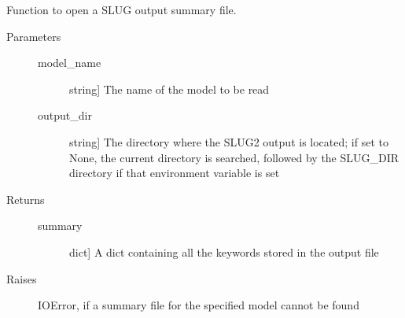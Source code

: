 \documentclass[letterpaper,10pt,english]{sphinxmanual}
\begin{document}
\begin{fulllineitems}
\label{slugpy:slugpy.read_summary}
Function to open a SLUG output summary file.
\begin{description}
\item[{Parameters}] \leavevmode\begin{description}
\item[{model\_name}] \leavevmode{[}string{]}
The name of the model to be read

\item[{output\_dir}] \leavevmode{[}string{]}
The directory where the SLUG2 output is located; if set to None,
the current directory is searched, followed by the SLUG\_DIR
directory if that environment variable is set

\end{description}

\item[{Returns}] \leavevmode\begin{description}
\item[{summary}] \leavevmode{[}dict{]}
A dict containing all the keywords stored in the output file

\end{description}

\item[{Raises}] \leavevmode
IOError, if a summary file for the specified model cannot be found

\end{description}

\end{fulllineitems}

\end{document}
